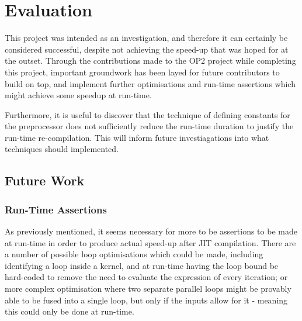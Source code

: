 
\section{Evaluation}
\label{s:eval}

This project was intended as an investigation, and therefore it can certainly be considered successful, despite not achieving the speed-up that was hoped for at the outset. Through the contributions made to the OP2 project while completing this project, important groundwork has been layed for future contributors to build on top, and implement further optimisations and run-time assertions which might achieve some speedup at run-time. \par Furthermore, it is useful to discover that the technique of defining constants for the preprocessor does not sufficiently reduce the run-time duration to justify the run-time re-compilation. This will inform future investiagations into what techniques should implemented.

\subsection{Future Work}
\label{ss:fw}

\subsubsection{Run-Time Assertions}
As previously mentioned, it seems necessary for more to be assertions to be made at run-time in order to produce actual speed-up after JIT compilation. There are a number of possible loop optimisations which could be made, including identifying a loop inside a kernel, and at run-time having the loop bound be hard-coded to remove the need to evaluate the expression of every iteration; or more complex optimisation where two separate parallel loops might be provably able to be fused into a single loop, but only if the inputs allow for it - meaning this could only be done at run-time.

